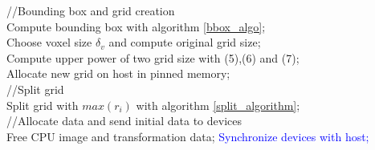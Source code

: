 \documentclass[12pt,journal,compsoc]{IEEEtran}
\begin{document}
\begin{algorithm}

\textcolor{OliveGreen}{//Bounding box and grid creation}\\
Compute bounding box with algorithm \ref{bbox_algo};\\
Choose voxel size $\delta_v$ and compute original grid size;\\
Compute upper power of two grid size with (5),(6) and (7);\\
Allocate new grid on host in pinned memory;\\

\textcolor{OliveGreen}{//Split grid}\\
Split grid with $max(r_i)$ with algorithm \ref{split_algorithm};\\

\textcolor{OliveGreen}{//Allocate data and send initial data to devices}\\
Free CPU image and transformation data;
\textcolor{Blue}{Synchronize devices with host;}

\end{algorithm}
\end{document}
